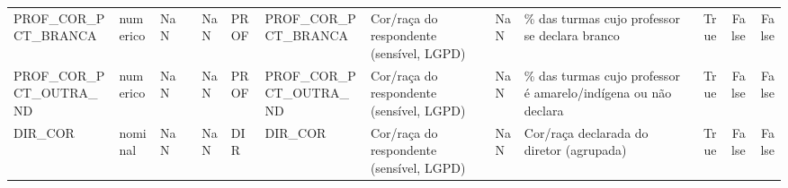 \begin{tabular}{llllllllllrrr}
PROF\_COR\_PCT\_BRANCA & numerico & NaN &  & NaN & PROF & PROF\_COR\_PCT\_BRANCA & Cor/raça do respondente (sensível, LGPD) & NaN & \% das turmas cujo professor se declara branco & True & False & False \\
PROF\_COR\_PCT\_OUTRA\_ND & numerico & NaN &  & NaN & PROF & PROF\_COR\_PCT\_OUTRA\_ND & Cor/raça do respondente (sensível, LGPD) & NaN & \% das turmas cujo professor é amarelo/indígena ou não declara & True & False & False \\
DIR\_COR & nominal & NaN &  & NaN & DIR & DIR\_COR & Cor/raça do respondente (sensível, LGPD) & NaN & Cor/raça declarada do diretor (agrupada) & True & False & False \\
\bottomrule
\end{tabular}
